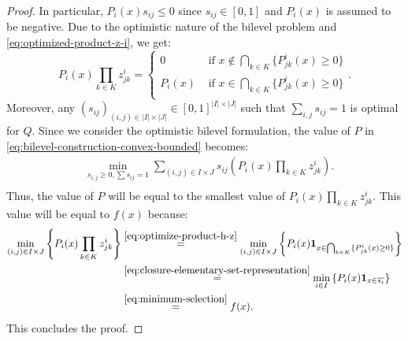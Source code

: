 \documentclass{article}
\newcommand{\mbf}[1]{\mathbf{#1}}
\theoremstyle{plain}
\theoremstyle{definition}
\begin{document}
\begin{proof}
    In particular, $P_i(x)s_{ij} \leq 0$ since $s_{ij} \in [0,1]$ and $P_i(x)$ is assumed to be negative. Due to the optimistic nature of the bilevel problem and \eqref{eq:optimized-product-z-i}, we get:
    \begin{equation}
        \label{eq:optimize-product-h-z}
        P_i(x)\prod_{k \in K} z_{jk}^i = \begin{cases}
            0 & \text{ if } x \notin \bigcap_{k \in K} \{P^i_{jk}(x) \geq 0\}\\
            P_i(x) & \text{ if } x \in \bigcap_{k \in K} \{P^i_{jk}(x) \geq 0\}\\
        \end{cases}.
    \end{equation}
    Moreover, any $(s_{ij})_{(i,j) \in |I| \times |J|} \in [0,1]^{|I| \times |J|}$ such that $\sum_{i,j} s_{ij} = 1$ is optimal for $Q$. Since we consider the optimistic bilevel formulation, the value of $P$ in  \eqref{eq:bilevel-construction-convex-bounded} becomes:
    \begin{equation*}
        \begin{aligned}
            &\underset{s_{i,j} \geq 0, \sum s_{ij} = 1}{\min} \sum_{(i,j) \in I \times J} s_{ij} \left(P_i(x)\prod_{k \in K} z^i_{jk} \right).\\
        \end{aligned}
    \end{equation*}
    Thus, the value of $P$ will be equal to the smallest value of $P_i(x)\prod_{k \in K} z^i_{jk}$. This value will be equal to $f(x)$ because:
    \begin{equation*}
        \begin{aligned}
            \underset{(i,j) \in I \times J}{\min} \left\{P_i(x)\prod_{k \in K} z^i_{jk}\right\} &\overset{\eqref{eq:optimize-product-h-z}}{=} \underset{(i,j) \in I \times J}{\min} \left\{P_i(x)\mbf{1}_{x \in \bigcap_{k \in K} \{P^i_{jk}(x) \geq 0\}}\right\} \\
            &\overset{\eqref{eq:closure-elementary-set-representation}}{=} \underset{i \in I}{\min} \left\{P_i(x)\mbf{1}_{x \in \overline{s_i}}\right\} \\
            &\overset{\eqref{eq:minimum-selection}}{=} f(x).
        \end{aligned}
    \end{equation*}
    This concludes the proof. 
\end{proof}
\end{document}
